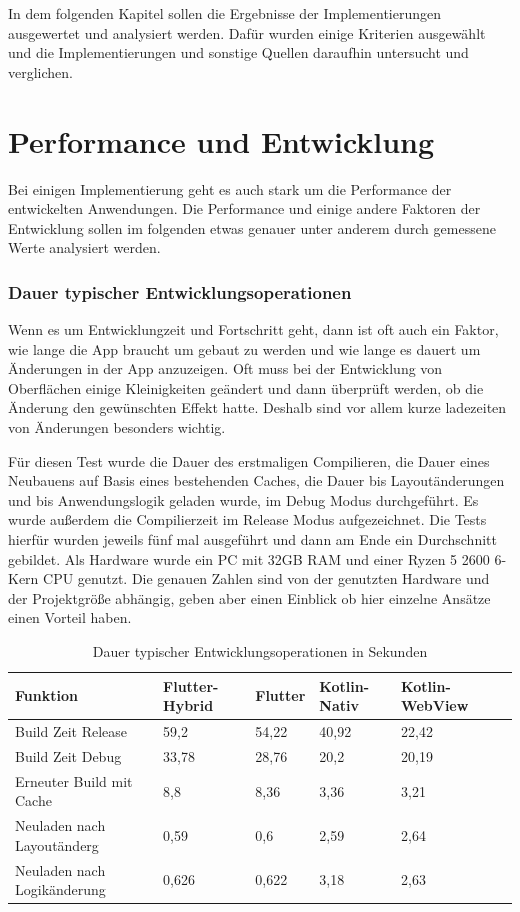 In dem folgenden Kapitel sollen die Ergebnisse der Implementierungen ausgewertet und analysiert werden. Dafür wurden einige Kriterien ausgewählt und die Implementierungen und sonstige Quellen daraufhin untersucht und verglichen.

\section{Performance und Entwicklung}
Bei einigen Implementierung geht es auch stark um die Performance der entwickelten Anwendungen. Die Performance und einige andere Faktoren der Entwicklung sollen im folgenden etwas genauer unter anderem durch gemessene Werte analysiert werden.

\subsubsection{Dauer typischer Entwicklungsoperationen}
Wenn es um Entwicklungzeit und Fortschritt geht, dann ist oft auch ein Faktor, wie lange die App braucht um gebaut zu werden und wie lange es dauert um Änderungen in der App anzuzeigen. Oft muss bei der Entwicklung von Oberflächen einige Kleinigkeiten geändert und dann überprüft werden, ob die Änderung den gewünschten Effekt hatte. Deshalb sind vor allem kurze ladezeiten von Änderungen besonders wichtig.

Für diesen Test wurde die Dauer des erstmaligen Compilieren, die Dauer eines Neubauens auf Basis eines bestehenden Caches, die Dauer bis Layoutänderungen und bis Anwendungslogik geladen wurde, im Debug Modus durchgeführt. Es wurde außerdem die Compilierzeit im Release Modus aufgezeichnet.
Die Tests hierfür wurden jeweils fünf mal ausgeführt und dann am Ende ein Durchschnitt gebildet. Als Hardware wurde ein PC mit 32GB RAM und einer Ryzen 5 2600 6-Kern CPU genutzt. 
Die genauen Zahlen sind von der genutzten Hardware und der Projektgröße abhängig, geben aber einen Einblick ob hier einzelne Ansätze einen Vorteil haben. 

\begin{table}
\centering
\caption{Dauer typischer Entwicklungsoperationen in Sekunden}
\begin{tabular}{ |p{4cm}||p{3cm}|p{2cm}|p{2cm}|p{3cm}|p{3cm}| }
 \hline
 Funktion & Flutter-Hybrid & Flutter & Kotlin-Nativ & Kotlin-WebView \\
 \hline
 Build Zeit Release       &   59,2&   54,22& 40,92& 22,42\\
  \hline
 Build Zeit Debug  & 33,78& 28,76& 20,2& 20,19\\
  \hline
 Erneuter Build mit Cache & 8,8& 8,36& 3,36& 3,21\\
  \hline
 Neuladen nach Layoutänderg & 0,59& 0,6& 2,59& 2,64\\
  \hline
 Neuladen nach Logikänderung & 0,626& 0,622& 3,18& 2,63\\
  \hline
\end{tabular}
\label{tab:evaluations_build_time}
\end{table}

